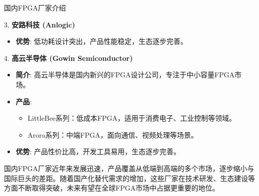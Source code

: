 \documentclass{beamer}
\providecommand{\tightlist}{%
  \setlength{\itemsep}{0pt}\setlength{\parskip}{0pt}}
\begin{document}
\begin{frame}[allowframebreaks]{国内FPGA厂家介绍}
\begin{block}{3. \textbf{安路科技 (Anlogic)}}
\begin{itemize}
    \begin{itemize}
    \tightlist
    \item
    Eagle系列：低功耗FPGA，适用于物联网、可穿戴设备等场景。\\
    \item
    Phoenix系列：高性能FPGA，面向通信、视频处理等领域。\\
    \end{itemize}
\item
    \textbf{优势}: 低功耗设计突出，产品性能稳定，生态逐步完善。
\end{itemize}
\end{block}
\pagebreak
\begin{block}{4. \textbf{高云半导体 (Gowin Semiconductor)}}
\begin{itemize}
\tightlist
\item
    \textbf{简介}:
    高云半导体是国内新兴的FPGA设计公司，专注于中小容量FPGA市场。
\item
    \textbf{产品}:

    \begin{itemize}
    \tightlist
    \item
    LittleBee系列：低成本FPGA，适用于消费电子、工业控制等领域。\\
    \item
    Arora系列：中端FPGA，面向通信、视频处理等场景。\\
    \end{itemize}
\item
    \textbf{优势}: 产品性价比高，开发工具易用，生态逐步完善。
\end{itemize}
\end{block}
\pagebreak
国内FPGA厂家近年来发展迅速，产品覆盖从低端到高端的多个市场，逐步缩小与国际巨头的差距。随着国产化替代需求的增加，这些厂家在技术研发、生态建设等方面不断取得突破，未来有望在全球FPGA市场中占据更重要的地位。
\end{frame}
\end{document}
